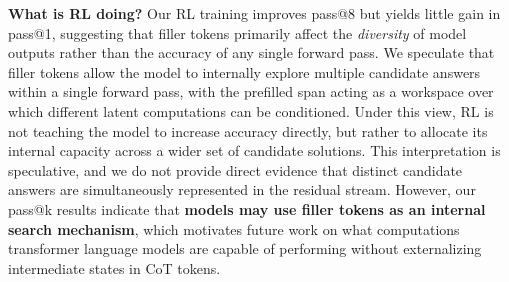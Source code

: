 \documentclass{article}
\begin{document}
\noindent \textbf{What is RL doing?} Our RL training improves pass@8 but yields little gain in pass@1, suggesting that filler tokens primarily affect the \textit{diversity} of model outputs rather than the accuracy of any single forward pass. We speculate that filler tokens allow the model to internally explore multiple candidate answers within a single forward pass, with the prefilled span acting as a workspace over which different latent computations can be conditioned. Under this view, RL is not teaching the model to increase accuracy directly, but rather to allocate its internal capacity across a wider set of candidate solutions. This interpretation is speculative, and we do not provide direct evidence that distinct candidate answers are simultaneously represented in the residual stream. However, our pass@k results indicate that \textbf{models may use filler tokens as an internal search mechanism}, which motivates future work on what computations transformer language models are capable of performing without externalizing intermediate states in CoT tokens.





\end{document}
